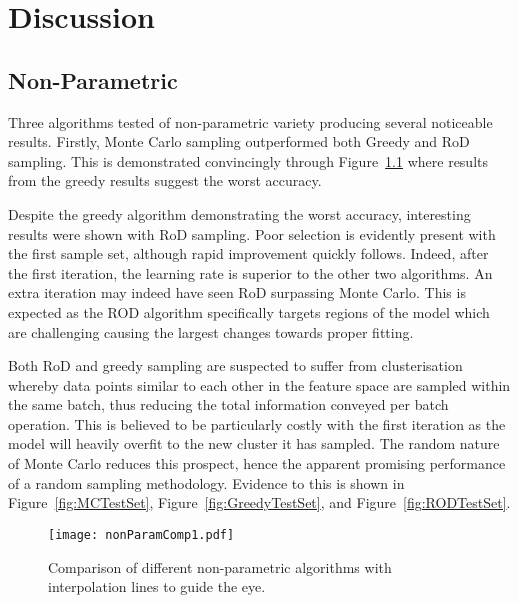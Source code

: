 \chapter{Discussion}


\graphicspath{{Chapter5/Figs/Vector/}{Chapter5/Figs/}}


\section{Non-Parametric}
Three algorithms tested of non-parametric variety producing several noticeable results. Firstly, Monte Carlo sampling outperformed both Greedy and RoD sampling. This is demonstrated convincingly through Figure~\ref{fig:nPComp} where results from the greedy results suggest the worst accuracy.

Despite the greedy algorithm demonstrating the worst accuracy, interesting results were shown with RoD sampling. Poor selection is evidently present with the first sample set, although rapid improvement quickly follows. Indeed, after the first iteration, the learning rate is superior to the other two algorithms. An extra iteration may indeed have seen RoD surpassing Monte Carlo. This is expected as the ROD algorithm specifically targets regions of the model which are challenging causing the largest changes towards proper fitting.

Both RoD and greedy sampling are suspected to suffer from clusterisation whereby data points similar to each other in the feature space are sampled within the same batch, thus reducing the total information conveyed per batch operation. This is believed to be particularly costly with the first iteration as the model will heavily overfit to the new cluster it has sampled. The random nature of Monte Carlo reduces this prospect, hence the apparent promising performance of a random sampling methodology. Evidence to this is shown in Figure~\ref{fig:MCTestSet}, Figure~\ref{fig:GreedyTestSet}, and Figure~\ref{fig:RODTestSet}.

\begin{figure}[h]
    \begin{center}
        \texttt{[image: nonParamComp1.pdf]}
        \caption[Non-Parametric Comparison]{Comparison of different non-parametric algorithms with interpolation lines to guide the eye.}
        \label{fig:nPComp}
    \end{center}
\end{figure}

